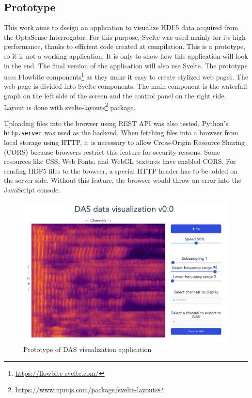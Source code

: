 \subsection{Prototype}

This work aims to design an application to visualize HDF5 data acquired from the OptaSense Interrogator. For this purpose, Svelte was used mainly for its high performance, thanks to efficient code created at compilation. This is a prototype, so it is not a working application. It is only to show how this application will look in the end. The final version of the application will also use Svelte. The prototype uses Flowbite components\footnote{\url{https://flowbite-svelte.com/}} as they make it easy to create stylized web pages. The web page is divided into Svelte components. The main component is the waterfall graph on the left side of the screen and the control panel on the right side. Layout is done with svelte-layouts\footnote{\url{https://www.npmjs.com/package/svelte-layouts}} package. 

Uploading files into the browser using REST API was also tested. Python's \verb|http.server| was used as the backend. When fetching files into a browser from local storage using HTTP, it is necessary to allow Cross-Origin Resource Sharing (CORS) because browsers restrict this feature for security reasons. Some resources like CSS, Web Fonts, and WebGL textures have enabled CORS. For sending HDF5 files to the browser, a special HTTP header has to be added on the server side. Without this feature, the browser would throw an error into the JavaScript console.

\begin{figure}
    \centering
    \includegraphics[width=\linewidth]{obrazky/svelte_prototype.png}
    \caption{Prototype of DAS visualization application}
    \label{fig:prototypesvelte}
\end{figure}






